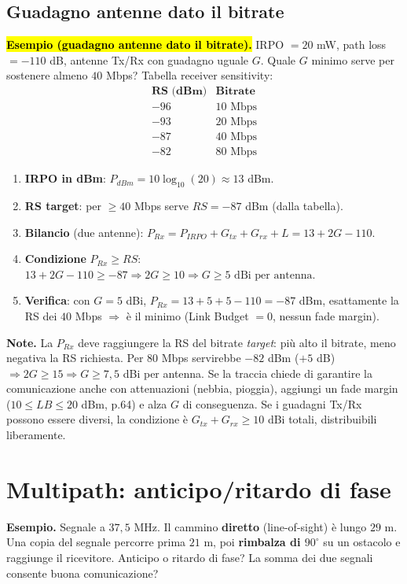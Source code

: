 \documentclass[11pt,a4paper]{report}
\begin{document}
\subsection{Guadagno antenne dato il bitrate}
\hl{\textbf{Esempio (guadagno antenne dato il bitrate).}} IRPO $=20$ mW,
path loss $=-110$ dB, antenne Tx/Rx con guadagno uguale $G$. Quale $G$ minimo
serve per sostenere almeno $40$ Mbps? Tabella receiver sensitivity:
\[
\begin{array}{c|c}
\textbf{RS (dBm)} & \textbf{Bitrate} \\ \hline
-96 & 10 \text{ Mbps} \\
-93 & 20 \text{ Mbps} \\
-87 & 40 \text{ Mbps} \\
-82 & 80 \text{ Mbps}
\end{array}
\]
\begin{enumerate}[noitemsep]
\item \textbf{IRPO in dBm}: $P_{dBm}=10\log_{10}(20)\approx 13$ dBm.
\item \textbf{RS target}: per $\ge 40$ Mbps serve $RS=-87$ dBm (dalla tabella).
\item \textbf{Bilancio} (due antenne):
$P_{Rx}=P_{IRPO}+G_{tx}+G_{rx}+L=13+2G-110$.
\item \textbf{Condizione} $P_{Rx}\ge RS$:
$13+2G-110\ge -87 \Rightarrow 2G\ge 10 \Rightarrow \boxed{G\ge 5 \text{ dBi per antenna}}$.
\item \textbf{Verifica}: con $G=5$ dBi, $P_{Rx}=13+5+5-110=-87$ dBm, esattamente
la RS dei $40$ Mbps $\Rightarrow$ è il minimo (Link Budget $=0$, nessun fade margin).
\end{enumerate}
\textbf{Note.} La $P_{Rx}$ deve raggiungere la RS del bitrate \emph{target}: più
alto il bitrate, meno negativa la RS richiesta. Per $80$ Mbps servirebbe
$-82$ dBm ($+5$ dB) $\Rightarrow 2G\ge 15 \Rightarrow G\ge 7{,}5$ dBi per antenna.
Se la traccia chiede di garantire la comunicazione anche con attenuazioni
(nebbia, pioggia), aggiungi un fade margin ($10\le LB\le 20$ dBm, p.64) e alza
$G$ di conseguenza. Se i guadagni Tx/Rx possono essere diversi, la condizione è
$G_{tx}+G_{rx}\ge 10$ dBi totali, distribuibili liberamente.

\section{Multipath: anticipo/ritardo di fase}
\label{teoria:multipath}
\textbf{Esempio.} Segnale a $37{,}5$ MHz. Il cammino
\textbf{diretto} (line-of-sight) è lungo $29$ m. Una copia del segnale percorre
prima $21$ m, poi \textbf{rimbalza di $90^\circ$} su un ostacolo e raggiunge il
ricevitore. Anticipo o ritardo di fase? La somma dei due segnali consente buona
comunicazione?
\end{document}
